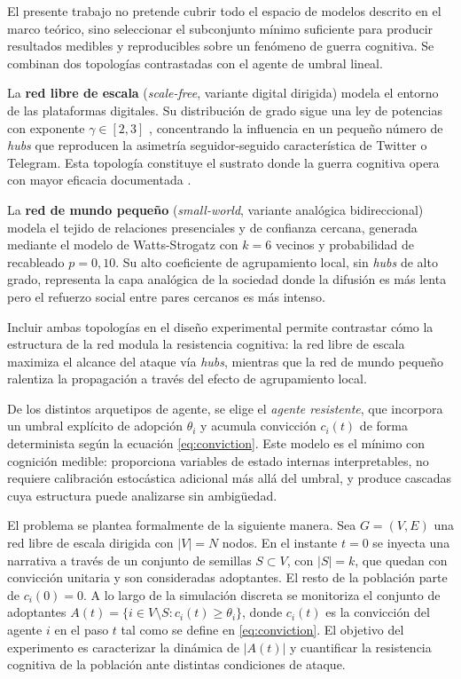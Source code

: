 El presente trabajo no pretende cubrir todo el espacio de modelos descrito en el marco teórico, sino seleccionar el subconjunto mínimo suficiente para producir resultados medibles y reproducibles sobre un fenómeno de guerra cognitiva. Se combinan dos topologías contrastadas con el agente de umbral lineal.

La \textbf{red libre de escala} (\emph{scale-free}, variante digital dirigida) modela el entorno de las plataformas digitales. Su distribución de grado sigue una ley de potencias con exponente $\gamma \in [2, 3]$ \cite{BarabasiAlbert1999}, concentrando la influencia en un pequeño número de \emph{hubs} que reproducen la asimetría seguidor-seguido característica de Twitter o Telegram. Esta topología constituye el sustrato donde la guerra cognitiva opera con mayor eficacia documentada \cite{Vosoughi2018}.

La \textbf{red de mundo pequeño} (\emph{small-world}, variante analógica bidireccional) modela el tejido de relaciones presenciales y de confianza cercana, generada mediante el modelo de Watts-Strogatz \cite{WattsStrogatz1998} con $k=6$ vecinos y probabilidad de recableado $p=0{,}10$. Su alto coeficiente de agrupamiento local, sin \emph{hubs} de alto grado, representa la capa analógica de la sociedad donde la difusión es más lenta pero el refuerzo social entre pares cercanos es más intenso.

Incluir ambas topologías en el diseño experimental permite contrastar cómo la estructura de la red modula la resistencia cognitiva: la red libre de escala maximiza el alcance del ataque vía \emph{hubs}, mientras que la red de mundo pequeño ralentiza la propagación a través del efecto de agrupamiento local.

De los distintos arquetipos de agente, se elige el \emph{agente resistente}, que incorpora un umbral explícito de adopción $\theta_i$ y acumula convicción $c_i(t)$ de forma determinista según la ecuación \ref{eq:conviction}. Este modelo es el mínimo con cognición medible: proporciona variables de estado internas interpretables, no requiere calibración estocástica adicional más allá del umbral, y produce cascadas cuya estructura puede analizarse sin ambigüedad.

\medskip

El problema se plantea formalmente de la siguiente manera. Sea $G = (V, E)$ una red libre de escala dirigida con $|V| = N$ nodos. En el instante $t = 0$ se inyecta una narrativa a través de un conjunto de semillas $S \subset V$, con $|S| = k$, que quedan con convicción unitaria y son consideradas adoptantes. El resto de la población parte de $c_i(0) = 0$. A lo largo de la simulación discreta se monitoriza el conjunto de adoptantes $A(t) = \{ i \in V \setminus S : c_i(t) \geq \theta_i \}$, donde $c_i(t)$ es la convicción del agente $i$ en el paso $t$ tal como se define en \ref{eq:conviction}. El objetivo del experimento es caracterizar la dinámica de $|A(t)|$ y cuantificar la resistencia cognitiva de la población ante distintas condiciones de ataque.

